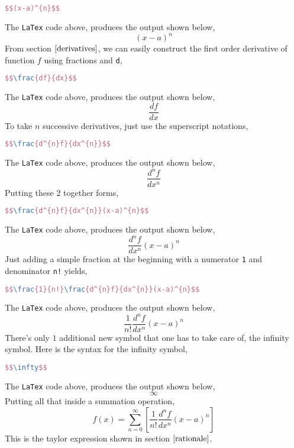 \documentclass[a4paper, 12pt]{report}
\begin{document}
\begin{center}
\begin{lstlisting}[language=tex]
$$(x-a)^{n}$$
\end{lstlisting}
The \texttt{LaTex} code above, produces the output shown below,
$$(x-a)^{n}$$
From section $\ref{derivatives}$, we can easily construct the first order derivative of function $f$ using fractions and \texttt{d},
\begin{lstlisting}[language=tex]
$$\frac{df}{dx}$$
\end{lstlisting}
The \texttt{LaTex} code above, produces the output shown below,
$$\frac{df}{dx}$$
To take $n$ successive derivatives, just use the superscript notations, 
\begin{lstlisting}[language=tex]
$$\frac{d^{n}f}{dx^{n}}$$
\end{lstlisting}
The \texttt{LaTex} code above, produces the output shown below,
$$\frac{d^{n}f}{dx^{n}}$$
Putting these $2$ together forms,
\begin{lstlisting}[language=tex]
$$\frac{d^{n}f}{dx^{n}}(x-a)^{n}$$
\end{lstlisting}
The \texttt{LaTex} code above, produces the output shown below,
$$\frac{d^{n}f}{dx^{n}}(x-a)^{n}$$
Just adding a simple fraction at the beginning with a numerator \texttt{1} and denominator \texttt{n!} yields,
\begin{lstlisting}[language=tex]
$$\frac{1}{n!}\frac{d^{n}f}{dx^{n}}(x-a)^{n}$$
\end{lstlisting}
The \texttt{LaTex} code above, produces the output shown below,
$$\frac{1}{n!}\frac{d^{n}f}{dx^{n}}(x-a)^{n}$$
There's only $1$ additional new symbol that one has to take care of, the infinity symbol. Here is the syntax for the infinity symbol,
\begin{lstlisting}[language=tex]
$$\infty$$
\end{lstlisting}
The \texttt{LaTex} code above, produces the output shown below,
$$\infty$$
Putting all that inside a summation operation,
$$f(x) = \sum^{\infty}_{n = 0}\left[\frac{1}{n!}\frac{d^{n}f}{dx^{n}}(x-a)^{n}\right]$$
This is the taylor expression shown in section $\ref{rationale}$. 


\end{center}
\end{document}
